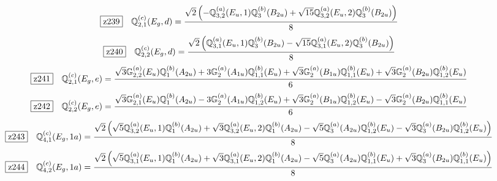 \documentclass[fleqn,10pt,landscape]{jsarticle}
\begin{document}
\begin{dmath*}
\hspace*{3mm}\fbox{z239}\quad \mathbb{Q}_{2,1}^{(c)}(E_{g},d)=\frac{\sqrt{2} \left(- \mathbb{Q}_{3,2}^{(a)}(E_{u},1) \mathbb{Q}_{3}^{(b)}(B_{2u}) + \sqrt{15} \mathbb{Q}_{3,2}^{(a)}(E_{u},2) \mathbb{Q}_{3}^{(b)}(B_{2u})\right)}{8}
\end{dmath*}
\begin{dmath*}
\hspace*{3mm}\fbox{z240}\quad \mathbb{Q}_{2,2}^{(c)}(E_{g},d)=\frac{\sqrt{2} \left(\mathbb{Q}_{3,1}^{(a)}(E_{u},1) \mathbb{Q}_{3}^{(b)}(B_{2u}) - \sqrt{15} \mathbb{Q}_{3,1}^{(a)}(E_{u},2) \mathbb{Q}_{3}^{(b)}(B_{2u})\right)}{8}
\end{dmath*}
\begin{dmath*}
\hspace*{3mm}\fbox{z241}\quad \mathbb{Q}_{2,1}^{(c)}(E_{g},e)=\frac{\sqrt{3} \mathbb{G}_{2,2}^{(a)}(E_{u}) \mathbb{Q}_{1}^{(b)}(A_{2u}) + 3 \mathbb{G}_{2}^{(a)}(A_{1u}) \mathbb{Q}_{1,1}^{(b)}(E_{u}) + \sqrt{3} \mathbb{G}_{2}^{(a)}(B_{1u}) \mathbb{Q}_{1,1}^{(b)}(E_{u}) + \sqrt{3} \mathbb{G}_{2}^{(a)}(B_{2u}) \mathbb{Q}_{1,2}^{(b)}(E_{u})}{6}
\end{dmath*}
\begin{dmath*}
\hspace*{3mm}\fbox{z242}\quad \mathbb{Q}_{2,2}^{(c)}(E_{g},e)=\frac{\sqrt{3} \mathbb{G}_{2,1}^{(a)}(E_{u}) \mathbb{Q}_{1}^{(b)}(A_{2u}) - 3 \mathbb{G}_{2}^{(a)}(A_{1u}) \mathbb{Q}_{1,2}^{(b)}(E_{u}) + \sqrt{3} \mathbb{G}_{2}^{(a)}(B_{1u}) \mathbb{Q}_{1,2}^{(b)}(E_{u}) - \sqrt{3} \mathbb{G}_{2}^{(a)}(B_{2u}) \mathbb{Q}_{1,1}^{(b)}(E_{u})}{6}
\end{dmath*}
\begin{dmath*}
\hspace*{3mm}\fbox{z243}\quad \mathbb{Q}_{4,1}^{(c)}(E_{g},1a)=\frac{\sqrt{2} \left(\sqrt{5} \mathbb{Q}_{3,2}^{(a)}(E_{u},1) \mathbb{Q}_{1}^{(b)}(A_{2u}) + \sqrt{3} \mathbb{Q}_{3,2}^{(a)}(E_{u},2) \mathbb{Q}_{1}^{(b)}(A_{2u}) - \sqrt{5} \mathbb{Q}_{3}^{(a)}(A_{2u}) \mathbb{Q}_{1,2}^{(b)}(E_{u}) - \sqrt{3} \mathbb{Q}_{3}^{(a)}(B_{2u}) \mathbb{Q}_{1,2}^{(b)}(E_{u})\right)}{8}
\end{dmath*}
\begin{dmath*}
\hspace*{3mm}\fbox{z244}\quad \mathbb{Q}_{4,2}^{(c)}(E_{g},1a)=\frac{\sqrt{2} \left(\sqrt{5} \mathbb{Q}_{3,1}^{(a)}(E_{u},1) \mathbb{Q}_{1}^{(b)}(A_{2u}) + \sqrt{3} \mathbb{Q}_{3,1}^{(a)}(E_{u},2) \mathbb{Q}_{1}^{(b)}(A_{2u}) - \sqrt{5} \mathbb{Q}_{3}^{(a)}(A_{2u}) \mathbb{Q}_{1,1}^{(b)}(E_{u}) + \sqrt{3} \mathbb{Q}_{3}^{(a)}(B_{2u}) \mathbb{Q}_{1,1}^{(b)}(E_{u})\right)}{8}
\end{dmath*}
\end{document}
